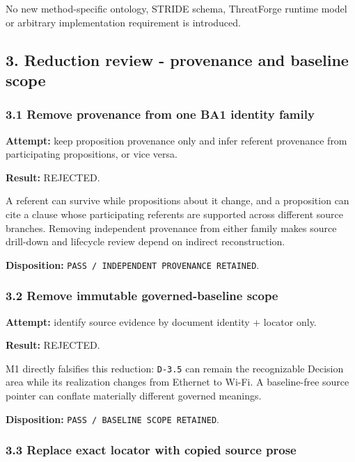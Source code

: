 \documentclass[11pt,a4paper]{article}
\begin{document}
No new method-specific ontology, STRIDE schema, ThreatForge runtime model or arbitrary implementation requirement is introduced.

\subsection{3. Reduction review - provenance and baseline scope}\label{reduction-review---provenance-and-baseline-scope}

\subsubsection{3.1 Remove provenance from one BA1 identity family}\label{remove-provenance-from-one-ba1-identity-family}

\textbf{Attempt:} keep proposition provenance only and infer referent provenance from participating propositions, or vice versa.

\textbf{Result:} REJECTED.

A referent can survive while propositions about it change, and a proposition can cite a clause whose participating referents are supported across different source branches. Removing independent provenance from either family makes source drill-down and lifecycle review depend on indirect reconstruction.

\textbf{Disposition:} \texttt{PASS\ /\ INDEPENDENT\ PROVENANCE\ RETAINED}.

\subsubsection{3.2 Remove immutable governed-baseline scope}\label{remove-immutable-governed-baseline-scope}

\textbf{Attempt:} identify source evidence by document identity + locator only.

\textbf{Result:} REJECTED.

M1 directly falsifies this reduction: \texttt{D-3.5} can remain the recognizable Decision area while its realization changes from Ethernet to Wi-Fi. A baseline-free source pointer can conflate materially different governed meanings.

\textbf{Disposition:} \texttt{PASS\ /\ BASELINE\ SCOPE\ RETAINED}.

\subsubsection{3.3 Replace exact locator with copied source prose}\label{replace-exact-locator-with-copied-source-prose}
\end{document}
